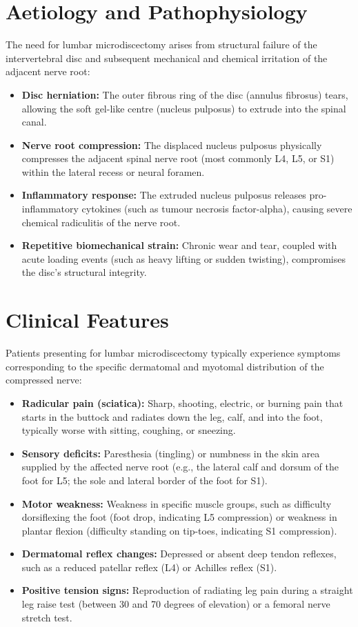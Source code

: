\section*{Aetiology and Pathophysiology}
The need for lumbar microdiscectomy arises from structural failure of the intervertebral disc and subsequent mechanical and chemical irritation of the adjacent nerve root:
\begin{itemize}
    \item \textbf{Disc herniation:} The outer fibrous ring of the disc (annulus fibrosus) tears, allowing the soft gel-like centre (nucleus pulposus) to extrude into the spinal canal.
    \item \textbf{Nerve root compression:} The displaced nucleus pulposus physically compresses the adjacent spinal nerve root (most commonly L4, L5, or S1) within the lateral recess or neural foramen.
    \item \textbf{Inflammatory response:} The extruded nucleus pulposus releases pro-inflammatory cytokines (such as tumour necrosis factor-alpha), causing severe chemical radiculitis of the nerve root.
    \item \textbf{Repetitive biomechanical strain:} Chronic wear and tear, coupled with acute loading events (such as heavy lifting or sudden twisting), compromises the disc's structural integrity.
\end{itemize}

\section*{Clinical Features}
Patients presenting for lumbar microdiscectomy typically experience symptoms corresponding to the specific dermatomal and myotomal distribution of the compressed nerve:
\begin{itemize}
    \item \textbf{Radicular pain (sciatica):} Sharp, shooting, electric, or burning pain that starts in the buttock and radiates down the leg, calf, and into the foot, typically worse with sitting, coughing, or sneezing.
    \item \textbf{Sensory deficits:} Paresthesia (tingling) or numbness in the skin area supplied by the affected nerve root (e.g., the lateral calf and dorsum of the foot for L5; the sole and lateral border of the foot for S1).
    \item \textbf{Motor weakness:} Weakness in specific muscle groups, such as difficulty dorsiflexing the foot (foot drop, indicating L5 compression) or weakness in plantar flexion (difficulty standing on tip-toes, indicating S1 compression).
    \item \textbf{Dermatomal reflex changes:} Depressed or absent deep tendon reflexes, such as a reduced patellar reflex (L4) or Achilles reflex (S1).
    \item \textbf{Positive tension signs:} Reproduction of radiating leg pain during a straight leg raise test (between 30 and 70 degrees of elevation) or a femoral nerve stretch test.
\end{itemize}

